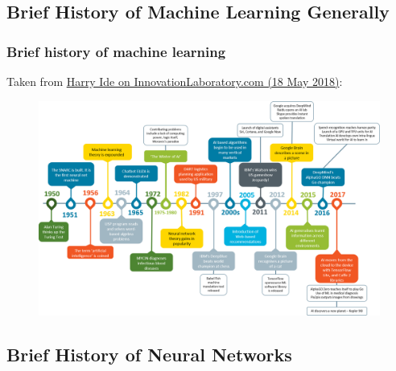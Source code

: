 \documentclass[hyperref={colorlinks=true}]{beamer}
\begin{document}
\subsection[Brief History of Machine Learning Generally]{Brief History of Machine Learning Generally}

\begin{frame}%
  \frametitle{Brief history of machine learning}

  Taken from \href{http://innovationobservatory.com/node/243}{Harry Ide on InnovationLaboratory.com (18 May 2018)}:
  
  \begin{figure}
    \centering
    \includegraphics[width=\textwidth]{MLBreakthroughs-Timeline-to-2017.png}
  \end{figure}
  
\end{frame}


\subsection[Brief History of Neural Networks]{Brief History of Neural Networks}
\end{document}
